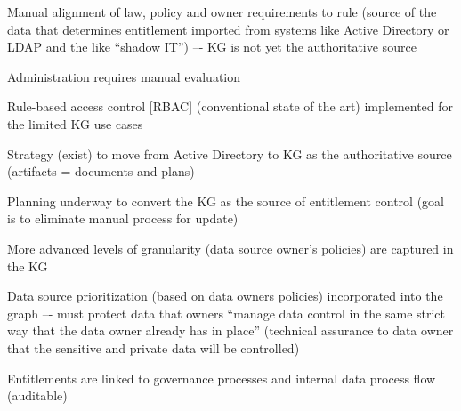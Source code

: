 \begin{members-only}

\kgmmscoringsection

\kgmmscoringlevelOne

\begin{scoring}

  \item Manual alignment of law, policy and owner requirements to rule (source of the data that determines entitlement
        imported from systems like Active Directory or LDAP and the like “shadow IT”) –-
        KG is not yet the authoritative source
  \item Administration requires manual evaluation
  \item Rule-based access control [RBAC] (conventional state of the art) implemented for the limited KG use cases

\end{scoring}

\kgmmscoringlevelTwo

\begin{scoring}

  \item Strategy (exist) to move from Active Directory to KG as the authoritative source
        (artifacts = documents and plans)
  \item Planning underway to convert the KG as the source of entitlement control
        (goal is to eliminate manual process for update)
  \item More advanced levels of granularity (data source owner’s policies) are captured in the KG
  \item Data source prioritization (based on data owners policies) incorporated into the graph –-
        must protect data that owners “manage data control in the same strict way that the data owner
        already has in place” (technical assurance to data owner that the sensitive and private data will be controlled)
  \item Entitlements are linked to governance processes and internal data process flow (auditable)

\end{scoring}

\kgmmscoringlevelThree

\begin{scoring}


\end{scoring}
\end{members-only}
